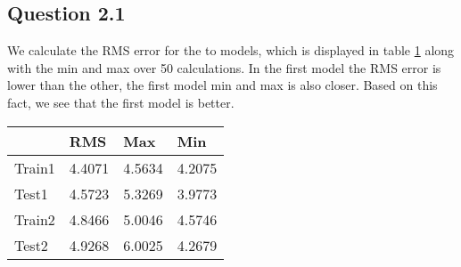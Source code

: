 \subsection*{Question 2.1}

We calculate the RMS error for the to models, which is displayed in
table \ref{tab:q21} along with the min and max over 50
calculations. In the first model the RMS error is lower than the
other, the first model min and max is also closer. Based on this fact,
we see that the first model is better.

\begin{table}[!htbp]
  \centering
  \begin{tabular}{| l | l | l | l |}
    \hline
    {}		& RMS		& Max		& Min \\
    \hline
    Train1	& 4.4071	& 4.5634	& 4.2075 \\
    \hline
    Test1	& 4.5723	& 5.3269	& 3.9773 \\
    \hline
    Train2	& 4.8466	& 5.0046	& 4.5746 \\
    \hline
    Test2	& 4.9268	& 6.0025	& 4.2679 \\
    \hline
  \end{tabular}
  \label{tab:q21}
\end{table}
